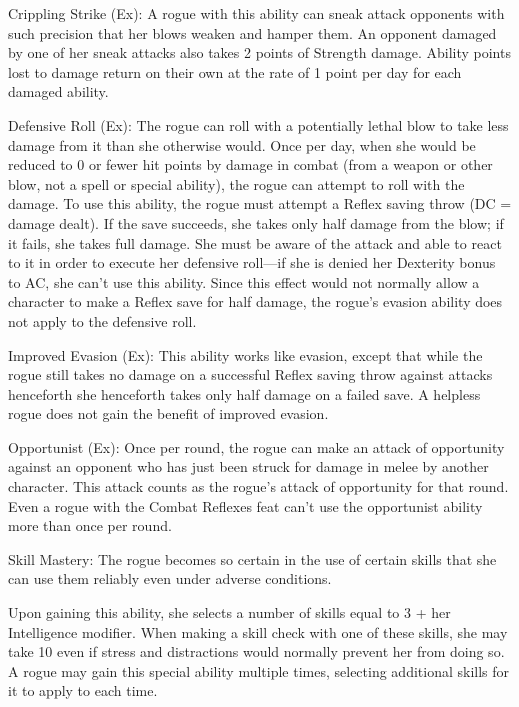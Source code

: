 \begin{description*}
\item[Crippling Strike (Ex):] A rogue with this ability can sneak attack opponents with such precision that her blows weaken and hamper them. An opponent damaged by one of her sneak attacks also takes 2 points of Strength damage. Ability points lost to damage return on their own at the rate of 1 point per day for each damaged ability.

\item[Defensive Roll (Ex):] The rogue can roll with a potentially lethal blow to take less damage from it than she otherwise would. Once per day, when she would be reduced to 0 or fewer hit points by damage in combat (from a weapon or other blow, not a spell or special ability), the rogue can attempt to roll with the damage. To use this ability, the rogue must attempt a Reflex saving throw (DC = damage dealt). If the save succeeds, she takes only half damage from the blow; if it fails, she takes full damage. She must be aware of the attack and able to react to it in order to execute her defensive roll---if she is denied her Dexterity bonus to AC, she can't use this ability. Since this effect would not normally allow a character to make a Reflex save for half damage, the rogue's evasion ability does not apply to the defensive roll.

\item[Improved Evasion (Ex):] This ability works like evasion, except that while the rogue still takes no damage on a successful Reflex saving throw against attacks henceforth she henceforth takes only half damage on a failed save. A helpless rogue does not gain the benefit of improved evasion.

\item[Opportunist (Ex):] Once per round, the rogue can make an attack of opportunity against an opponent who has just been struck for damage in melee by another character. This attack counts as the rogue's attack of opportunity for that round. Even a rogue with the Combat Reflexes feat can't use the opportunist ability more than once per round.

\item[Skill Mastery:] The rogue becomes so certain in the use of certain skills that she can use them reliably even under adverse conditions.

Upon gaining this ability, she selects a number of skills equal to 3 + her Intelligence modifier. When making a skill check with one of these skills, she may take 10 even if stress and distractions would normally prevent her from doing so. A rogue may gain this special ability multiple times, selecting additional skills for it to apply to each time.


\end{description*}
